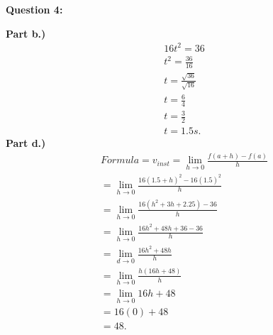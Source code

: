 \documentclass{report}
\begin{document}
    \bigbreak \noindent \bigbreak \noindent \bigbreak \noindent 
    \begin{Large}
       \textbf{Question 4:}
    \end{Large}
    \bigbreak \noindent 
    \bigbreak \noindent 
    \textbf{Part b.)} 
    \begin{align*}
        16t^2 = 36 \\ 
         t^2 = \frac{36}{16} \\ 
         t = \frac{ \sqrt{36}}{ \sqrt{16}} \\
         t = \frac{6}{4} \\ 
         t = \frac{3}{2} \\
         t = 1.5 s 
    .\end{align*}
    \bigbreak \noindent 
    \textbf{Part d.)}
    \begin{align*}
        Formula = v_{inst} = \lim\limits_{h \to 0}{ \frac{f(a+h) - f(a)}{h}} \\ 
        = \lim\limits_{h \to 0}{ \frac{16(1.5+h)^2 - 16(1.5)^2}{h}} \\
        = \lim\limits_{h \to 0}{ \frac{16(h^2 + 3h + 2.25) - 36}{h}} \\ 
        = \lim\limits_{h \to 0}{ \frac{16h^2 + 48h + 36 - 36}{h}} \\ 
        = \lim\limits_{d \to 0}{ \frac{16h^2+48h}{h}} \\
        = \lim\limits_{h \to 0}{ \frac{h(16h + 48)}{h}} \\ 
        = \lim\limits_{h \to 0}{16h + 48} \\ 
        = 16(0) + 48 \\ 
        = 48
    .\end{align*}
\end{document}
